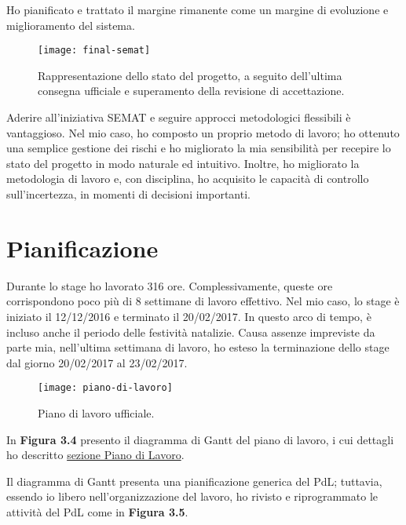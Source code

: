 Ho pianificato e trattato il margine 
rimanente come un margine di evoluzione 
e miglioramento del sistema.

\begin{figure}[htbp]
	\begin{center}
		\texttt{[image: final-semat]}
		\caption{Rappresentazione dello stato del progetto, 
			a seguito dell'ultima consegna ufficiale e 
			superamento della revisione di accettazione.}
	\end{center}
\end{figure}  

Aderire all'iniziativa SEMAT e seguire approcci metodologici  
flessibili è vantaggioso. Nel mio caso, ho composto un proprio 
metodo di lavoro; ho ottenuto una semplice gestione dei 
rischi e ho migliorato la mia sensibilità per recepire 
lo stato del progetto in modo naturale ed intuitivo. 
Inoltre, ho migliorato la metodologia di lavoro e, 
con disciplina, ho acquisito le capacità di controllo 
sull'incertezza, in momenti di decisioni importanti. 


\section{Pianificazione}
Durante lo stage ho lavorato 316 ore. 
Complessivamente, queste ore corrispondono poco 
più di 8 settimane di lavoro effettivo. Nel mio 
caso, lo stage è iniziato il 12/12/2016 e 
terminato il 20/02/2017. In questo arco di 
tempo, è incluso anche il periodo delle 
festività natalizie. Causa assenze impreviste 
da parte mia, nell'ultima settimana di lavoro,
ho esteso la terminazione dello stage dal 
giorno 20/02/2017 al 23/02/2017.

\begin{figure}[htbp]
	\begin{center}
		\texttt{[image: piano-di-lavoro]}
		\caption{Piano di lavoro ufficiale.}
	\end{center}
\end{figure}

In \textbf{Figura 3.4} presento il diagramma di Gantt del piano 
di lavoro,  i cui dettagli ho descritto
\hyperref[sec:piano-di-lavoro]{sezione Piano di Lavoro}.  

Il diagramma di Gantt presenta una pianificazione generica del PdL; 
tuttavia, essendo io libero nell'organizzazione del lavoro, 
ho rivisto e riprogrammato le attività del PdL come in \textbf{Figura 3.5}. 

